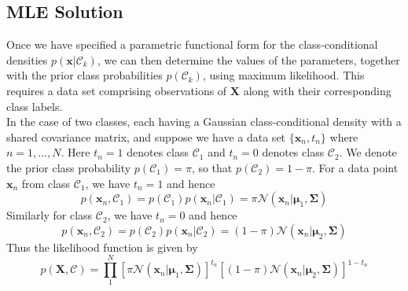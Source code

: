 \documentclass[twoside]{article}
\begin{document}
\subsection{MLE Solution}
Once we have specified a parametric functional form for the class-conditional densities $p(\boldsymbol{x}|\mathcal{C}_k)$, we can then determine the values of the parameters, together with the prior class probabilities $p(\mathcal{C}_k)$, using maximum likelihood. This requires a data set comprising observations of $\boldsymbol{X}$ along with their corresponding class labels.\\
In the case of two classes, each having a Gaussian class-conditional density with a shared covariance matrix, and suppose we have a data set $\{\boldsymbol{x}_n, t_n\}$ where $n = 1,..., N$. Here $t_n = 1$ denotes class $\mathcal{C}_1$ and $t_n = 0$ denotes class $\mathcal{C}_2$. We denote the prior class probability $p(\mathcal{C}_1) = \pi$, so that $p(\mathcal{C}_2) = 1 - \pi$. For a data point $\boldsymbol{x}_n$ from class $\mathcal{C}_1$, we have $t_n = 1$ and hence
\begin{equation*}
    p(\boldsymbol{x}_n, \mathcal{C}_1) = p(\mathcal{C}_1)p(\boldsymbol{x}_n| \mathcal{C}_1)=\pi\mathcal{N}(\boldsymbol{x}_n|\boldsymbol{\mu}_1, \boldsymbol{\Sigma})
\end{equation*}
Similarly for class $\mathcal{C}_2$, we have $t_n = 0$ and hence
\begin{equation*}
     p(\boldsymbol{x}_n, \mathcal{C}_2) = p(\mathcal{C}_2)p(\boldsymbol{x}_n| \mathcal{C}_2)=(1 -\pi)\mathcal{N}(\boldsymbol{x}_n|\boldsymbol{\mu}_2, \boldsymbol{\Sigma})
\end{equation*}
Thus the likelihood function is given by
\begin{equation*}
    p(\boldsymbol{X}, \boldsymbol{\mathcal{C}}) = \prod_1^N
    [\pi\mathcal{N}(\boldsymbol{x}_n|\boldsymbol{\mu}_1, \boldsymbol{\Sigma})]^{t_n} [(1 -\pi)\mathcal{N}(\boldsymbol{x}_n|\boldsymbol{\mu}_2, \boldsymbol{\Sigma})]^{1-t_n}
\end{equation*}
\end{document}
